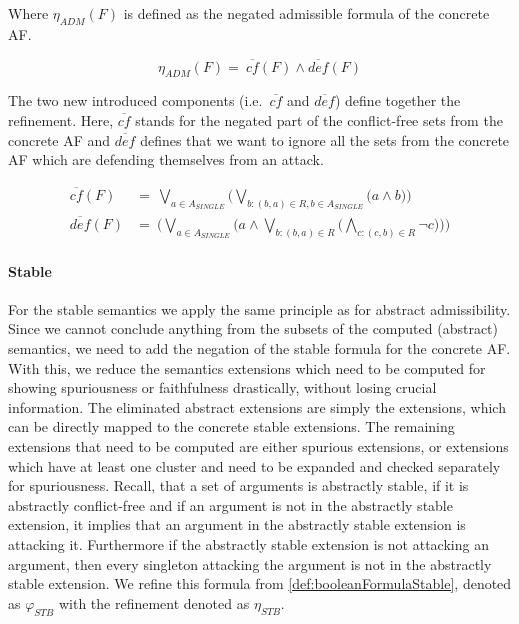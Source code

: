 Where $\eta_{\!A\!D\!M}(F)$ is defined as the negated admissible formula of the concrete AF.

\vspace{0.1cm}

$$
    \eta_{\!A\!D\!M}(F)=\ \overline{cf}(F) \land \overline{def}(F)
$$

\vspace{0.1cm}

The two new introduced components (i.e.\ $\overline{cf}$ and $\overline{def}$) define together the refinement. Here, $\overline{cf}$ stands for the negated part of the conflict-free sets from the concrete AF and $\overline{def}$ defines that we want to ignore all the sets from the concrete AF which are defending themselves from an attack.

\begin{align*}
    \overline{cf}(F)&=\ \bigvee_{a \in A_{\!S\!I\!N\!G\!L\!E}} \big( \bigvee_{b:(b,a)\in R, b \in A_{\!S\!I\!N\!G\!L\!E}} \big( a \land b \big) \big)\\
    \overline{def}(F)&=\ \big( \bigvee_{a \in A_{\!S\!I\!N\!G\!L\!E}}\big( a \land \bigvee_{b:(b,a)\in R} \big( \bigwedge_{c:(c, b)\in R} \lnot c\big)\big) \big)
\end{align*}

\paragraph{Stable} For the stable semantics we apply the same principle as for abstract admissibility. Since we cannot conclude anything from the subsets of the computed (abstract) semantics, we need to add the negation of the stable formula for the concrete AF. With this, we reduce the semantics extensions which need to be computed for showing spuriousness or faithfulness drastically, without losing crucial information. The eliminated abstract extensions are simply the extensions, which can be directly mapped to the concrete stable extensions. The remaining extensions that need to be computed are either spurious extensions, or extensions which have at least one cluster and need to be expanded and checked separately for spuriousness. Recall, that a set of
arguments is abstractly stable, if it is abstractly conflict-free and if an argument is not in the abstractly stable extension, it implies that an argument in the abstractly stable extension is attacking it. Furthermore if the abstractly stable extension is not attacking an argument, then every singleton attacking the argument is not in the abstractly stable extension. We refine this formula from \cref{def:booleanFormulaStable}, denoted as $\varphi_{\!S\!T\!B}$ with the refinement denoted as $\eta_{S\!T\!B}$.


